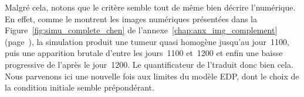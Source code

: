 \documentclass[main.tex]{subfiles}
\begin{document}
Malgré cela, notons que le critère semble tout de même bien décrire l'\hetero numérique. 
En effet, comme le montrent les images numériques présentées dans la Figure~\ref{fig:simu_complete_chen} de l'annexe~\ref{chap:anx_img_complement} (page~\pageref{fig:simu_complete_chen}), la simulation produit une tumeur quasi homogène jusqu'au jour~1100, puis une apparition brutale d'\hetero entre les jours~1100 et~1200 et enfin une baisse progressive de l'\hetero après le jour~1200. Le quantificateur de l'\hetero \HH traduit donc bien cela. Nous parvenons ici une nouvelle fois aux limites du modèle EDP, dont le choix de la condition initiale semble prépondérant.
\end{document}
